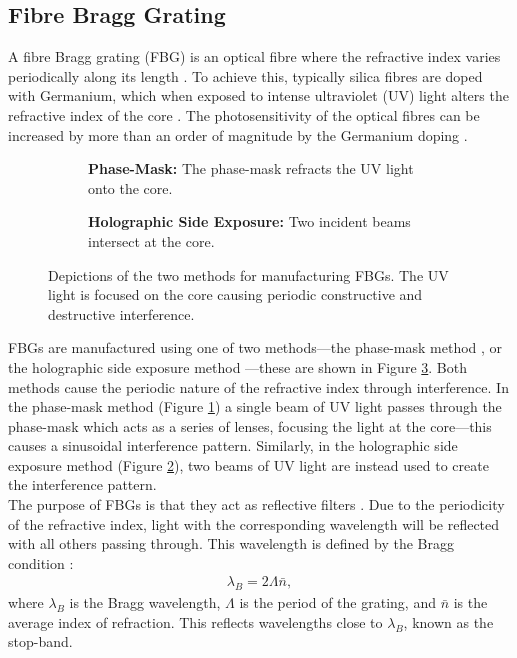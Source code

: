\subsection{Fibre Bragg Grating}
A fibre Bragg grating (FBG) is an optical fibre where the refractive index varies periodically along its length \cite{ferreira}. To achieve this, typically silica fibres are doped with Germanium, which when exposed to intense ultraviolet (UV) light alters the refractive index of the core \cite{becker, starodoumov}. The photosensitivity of the optical fibres can be increased by more than an order of magnitude by the Germanium doping \cite{becker, ferreira}. \\

\begin{figure}[p]
\centering
\begin{subfigure}{\textwidth}
\centering

\caption{\textbf{Phase-Mask:} The phase-mask refracts the UV light onto the core.}
\label{fig:phasemask}
\vspace{10mm}
\end{subfigure}
\begin{subfigure}{\textwidth}
\centering

\caption{\textbf{Holographic Side Exposure:} Two incident beams intersect at the core.}
\label{fig:holographic}
\end{subfigure}
\caption{Depictions of the two methods for manufacturing FBGs. The UV light is focused on the core causing periodic constructive and destructive interference.}
\label{fig:fbgmake}
\end{figure}

FBGs are manufactured using one of two methods---the phase-mask method \cite{agrawal2002, alazzawi, becker, starodoumov}, or the holographic side exposure method \cite{agrawal2002, alazzawi, becker, ferreira, starodoumov}---these are shown in Figure \ref{fig:fbgmake}. Both methods cause the periodic nature of the refractive index through interference. In the phase-mask method (Figure \ref{fig:phasemask}) a single beam of UV light passes through the phase-mask which acts as a series of lenses, focusing the light at the core---this causes a sinusoidal interference pattern. Similarly, in the holographic side exposure method (Figure \ref{fig:holographic}), two beams of UV light are instead used to create the interference pattern. \\

The purpose of FBGs is that they act as reflective filters \cite{agrawal2002, alazzawi, ferreira, starodoumov}. Due to the periodicity of the refractive index, light with the corresponding wavelength will be reflected with all others passing through. This wavelength is defined by the Bragg condition \cite{agrawal2002, alazzawi, becker, ferreira, silfvast, starodoumov}:
\begin{align}
\label{eq:bragg}
\lambda_B = 2 \Lambda \bar{n},
\end{align}
where $\lambda_B$ is the Bragg wavelength, $\Lambda$ is the period of the grating, and $\bar{n}$ is the average index of refraction. This reflects wavelengths close to $\lambda_B$, known as the stop-band. \\

